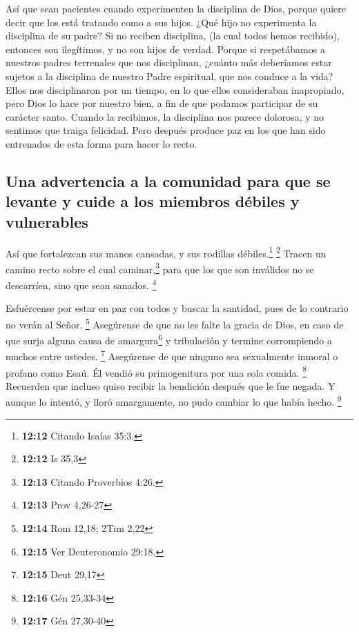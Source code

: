  Así que sean pacientes cuando experimenten la disciplina
de Dios, porque quiere decir que los está tratando como a sus hijos.
¿Qué hijo no experimenta la disciplina de su padre?  Si no
reciben disciplina, (la cual todos hemos recibido), entonces son
ilegítimos, y no son hijos de verdad.  Porque si
respetábamos a nuestros padres terrenales que nos disciplinan, ¿cuánto
más deberíamos estar sujetos a la disciplina de nuestro Padre
espiritual, que nos conduce a la vida?  Ellos nos
disciplinaron por un tiempo, en lo que ellos consideraban inapropiado,
pero Dios lo hace por nuestro bien, a fin de que podamos participar de
su carácter santo.  Cuando la recibimos, la disciplina
nos parece dolorosa, y no sentimos que traiga felicidad. Pero después
produce paz en los que han sido entrenados de esta forma para hacer lo
recto.

\hypertarget{una-advertencia-a-la-comunidad-para-que-se-levante-y-cuide-a-los-miembros-duxe9biles-y-vulnerables}{%
\subsection{Una advertencia a la comunidad para que se levante y cuide a
los miembros débiles y
vulnerables}\label{una-advertencia-a-la-comunidad-para-que-se-levante-y-cuide-a-los-miembros-duxe9biles-y-vulnerables}}

 Así que fortalezcan sus manos cansadas, y sus rodillas
débiles.\footnote{\textbf{12:12} Citando Isaías 35:3.} \footnote{\textbf{12:12}
  Is 35,3}  Tracen un camino recto sobre el cual
caminar,\footnote{\textbf{12:13} Citando Proverbios 4:26.} para que los
que son inválidos no se descarríen, sino que sean sanados. \footnote{\textbf{12:13}
  Prov 4,26-27}

 Esfuércense por estar en paz con todos y buscar la
santidad, pues de lo contrario no verán al Señor. \footnote{\textbf{12:14}
  Rom 12,18; 2Tim 2,22}  Asegúrense de que no les falte
la gracia de Dios, en caso de que surja alguna causa de
amargura\footnote{\textbf{12:15} Ver Deuteronomio 29:18.} y tribulación
y termine corrompiendo a muchos entre ustedes. \footnote{\textbf{12:15}
  Deut 29,17}  Asegúrense de que ninguno sea sexualmente
inmoral o profano como Esaú. Él vendió su primogenitura por una sola
comida. \footnote{\textbf{12:16} Gén 25,33-34}  Recuerden
que incluso quiso recibir la bendición después que le fue negada. Y
aunque lo intentó, y lloró amargamente, no pudo cambiar lo que había
hecho. \footnote{\textbf{12:17} Gén 27,30-40}

